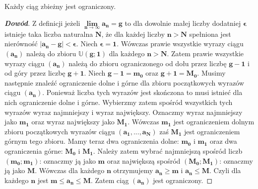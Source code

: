 \begin{theorem}
    Każdy ciąg zbieżny jest ograniczony.
\end{theorem}
\begin{proof}[\textbf{Dowód}]
Z definicji jeżeli $\boldsymbol{\lim\limits_{n\to \infty }a_{n}=g}$ to dla 
dowolnie małej liczby dodatniej $\boldsymbol{\epsilon}$ istnieje taka 
liczba naturalna $\boldsymbol{N}$, że dla każdej liczby $\boldsymbol{n > N}$ 
spełniona jest nierówność $\boldsymbol{\left |a_{n}-g\right| < \epsilon}$. 
Niech $\boldsymbol{\epsilon=1}$. Wówczas prawie wszystkie wyrazy 
ciągu $\boldsymbol{\left (a_{n}\right)}$ należą do zbioru 
$\boldsymbol{\mathbb{U}\left (g;1\right)}$ dla każdego $\boldsymbol{n > N}$. 
Zatem prawie wszystkie wyrazy ciągu $\boldsymbol{\left (a_{n}\right)}$ 
należą do zbioru ograniczonego od dołu przez liczbę $\boldsymbol{g-1}$ 
i od góry przez liczbę $\boldsymbol{g+1}$. Niech $\boldsymbol{g-1=m_{0}}$ 
oraz $\boldsymbol{g+1=M_{0}}$. Musimy następnie znaleźć ograniczenie dolne i
 górne dla zbioru początkowych wyrazów ciągu $\boldsymbol{\left (a_{n}\right)}$. 
 Ponieważ liczba tych wyrazów jest skończona to musi istnieć dla nich 
 ograniczenie dolne i górne. Wybierzmy zatem spośród wszystkich tych wyrazów 
 wyraz najmniejszy i wyraz największy. Oznaczmy wyraz najmniejszy 
 jako $\boldsymbol{m_{1}}$ oraz wyraz największy jako $\boldsymbol{M_{1}}$. 
 Wówczas  $\boldsymbol{m_{1}}$ jest ograniczeniem dolnym zbioru początkowych 
 wyrazów ciągu  $\boldsymbol{\left (a_{1},...,a_{N}\right)}$ zaś 
 $\boldsymbol{M_{1}}$ jest ograniczeniem górnym tego zbioru. Mamy teraz dwa
 ograniczenia dolne: $\boldsymbol{m_{0}}$ i $\boldsymbol{m_{1}}$ oraz dwa 
 ograniczenia górne: $\boldsymbol{M_{0}}$ i $\boldsymbol{M_{1}}$. Należy zatem 
 wybrać najmniejszą spośród liczb $\boldsymbol{\left (m_{0};m_{1}\right)}$: 
 oznaczmy ją jako $\boldsymbol{m}$ oraz największą spośród 
 $\boldsymbol{\left (M_{0};M_{1}\right)}$: oznaczmy ją jako $\boldsymbol{M}$. 
 Wówczas dla każdego $\boldsymbol{n}$ otrzymujemy $\boldsymbol{a_{n} \geqslant m}$ 
 i $\boldsymbol{a_{n} \leqslant M}$. Czyli dla każdego $\boldsymbol{n}$ 
 jest $\boldsymbol{m \leqslant a_{n} \leqslant M}$. 
 Zatem ciąg $\boldsymbol{\left (a_{n}\right)}$ jest ograniczony.
 \end{proof}